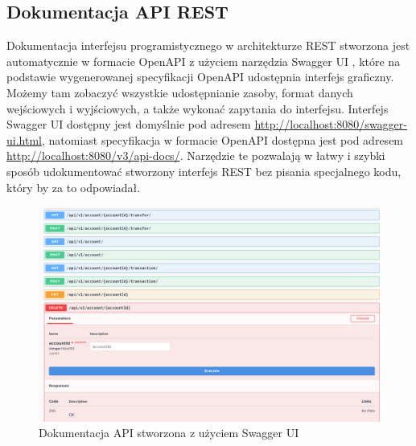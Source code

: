 \documentclass[shortabstract,inz]{iithesis}
\begin{document}
\subsection*{Dokumentacja API REST}
Dokumentacja interfejsu programistycznego w architekturze REST stworzona jest automatycznie w formacie OpenAPI \citep{openapi} z użyciem narzędzia Swagger UI \citep{swagger}, które na podstawie wygenerowanej specyfikacji OpenAPI udostępnia interfejs graficzny. Możemy tam zobaczyć wszystkie udostępnianie zasoby, format danych wejściowych i wyjściowych, a także wykonać zapytania do interfejsu. Interfejs Swagger UI dostępny jest domyślnie pod adresem \url{http://localhost:8080/swagger-ui.html}, natomiast specyfikacja w formacie OpenAPI dostępna jest pod adresem \url{http://localhost:8080/v3/api-docs/}. Narzędzie te pozwalają w łatwy i szybki sposób udokumentować stworzony interfejs REST bez pisania specjalnego kodu, który by za to odpowiadał.
\begin{figure}
\centering
	\includegraphics[scale=0.37]{screen-swagger.png}
	\caption{Dokumentacja API stworzona z użyciem Swagger UI}
	\label{fig:screen-category-add-form}
\end{figure}
\end{document}
